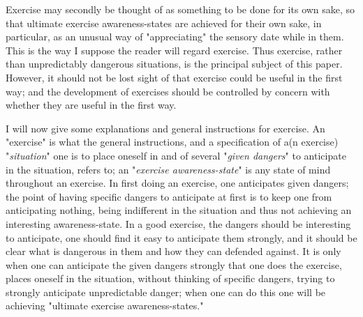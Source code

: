 Exercise may secondly be thought of as something to be done for its own 
sake, so that ultimate exercise awareness-states are achieved for their own 
sake, in particular, as an unusual way of "appreciating" the sensory date 
while in them. This is the way I suppose the reader will regard exercise. Thus 
exercise, rather than unpredictably dangerous situations, is the principal 
subject of this paper. However, it should not be lost sight of that exercise 
could be useful in the first way; and the development of exercises should be 
controlled by concern with whether they are useful in the first way. 

I will now give some explanations and general instructions for exercise. 
An "exercise" is what the general instructions, and a specification of a(n 
exercise) "\emph{situation}" one is to place oneself in and of several 
"\emph{given dangers}" to anticipate in the situation, refers to;
an "\emph{exercise awareness-state}" 
is any state of mind throughout an exercise. In first doing an exercise, one 
anticipates given dangers; the point of having specific dangers to anticipate 
at first is to keep one from anticipating nothing, being indifferent in the 
situation and thus not achieving an interesting awareness-state. In a good 
exercise, the dangers should be interesting to anticipate, one should find it 
easy to anticipate them strongly, and it should be clear what is dangerous 
in them and how they can defended against. It is only when one can 
anticipate the given dangers strongly that one does the exercise, places 
oneself in the situation, without thinking of specific dangers, trying to
strongly anticipate unpredictable danger; when one can do this one will be 
achieving "ultimate exercise awareness-states." 

